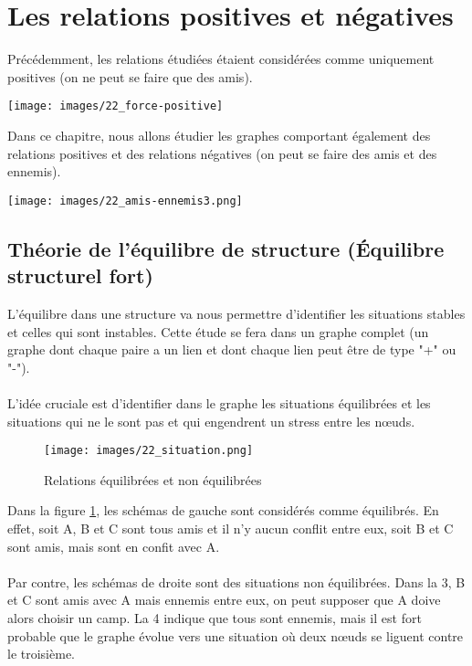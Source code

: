 \section{Les relations positives et négatives}

Précédemment, les relations étudiées étaient considérées comme uniquement positives (on ne peut se faire que des amis). 

\texttt{[image: images/22\_force-positive]}

Dans ce chapitre, nous allons étudier les graphes comportant également des relations positives et des relations négatives (on peut se faire des amis et des ennemis).

\texttt{[image: images/22\_amis-ennemis3.png]}

\subsection{Théorie de l'équilibre de structure (Équilibre structurel fort)}
L'équilibre dans une structure va nous permettre d'identifier les situations stables et celles qui sont instables. Cette étude se fera dans un graphe complet (un graphe dont chaque paire a un lien et dont chaque lien peut être de type "+" ou "-").

\paragraph{}
L'idée cruciale est d'identifier dans le graphe les situations équilibrées et les situations qui ne le sont pas et qui engendrent un stress entre les nœuds.  

\begin{figure}[h!]
	\centering
	\texttt{[image: images/22\_situation.png]}
	\label{equi}
	\caption{Relations équilibrées et non équilibrées}
\end{figure}


Dans la figure \ref{equi}, les schémas de gauche sont considérés comme équilibrés. En effet, soit A, B et C sont tous amis et il n'y aucun conflit entre eux, soit B et C sont amis, mais sont en confit avec A. 

\paragraph{}
Par contre, les schémas de droite sont des situations non équilibrées. Dans la 3, B et C sont amis avec A mais ennemis entre eux, on peut supposer que A doive alors choisir un camp. La 4 indique que tous sont ennemis, mais il est fort probable que le graphe évolue vers une situation où deux nœuds se liguent contre le troisième. 

